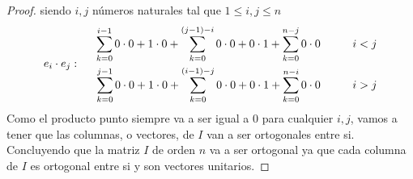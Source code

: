 \begin{enumerate}[label=\listAlph]
\begin{proof}
                siendo \(i, j\) números naturales tal que \(1 \leq i, j \leq n\)
                \[
                    e_i \cdot e_j: 
                    \hspace{0.5cm}
                    \begin{aligned}
                        \sum_{k = 0}^{i - 1} 0 \cdot 0 + 1 \cdot 0 + \sum_{k = 0}^{(j - 1) - i} 0 \cdot 0 + 0 \cdot 1 + \sum_{k = 0}^{n - j} 0 \cdot 0
                        \hspace{1cm}
                        i < j
                        \\
                        \sum_{k = 0}^{j - 1} 0 \cdot 0 + 1 \cdot 0 + \sum_{k = 0}^{(i - 1) - j} 0 \cdot 0 + 0 \cdot 1 + \sum_{k = 0}^{n - i} 0 \cdot 0 
                        \hspace{1cm}
                        i > j
                    \end{aligned}
                \]
                Como el producto punto siempre va a ser igual a 0 para cualquier \(i, j\), vamos a tener que las columnas, o vectores, de \(I\) 
                van a ser ortogonales entre si.
                Concluyendo que la matriz \(I\) de orden \(n\) va a ser ortogonal ya que cada columna de \(I\) es ortogonal entre si y son vectores unitarios.
            \end{proof}
    \end{enumerate}
